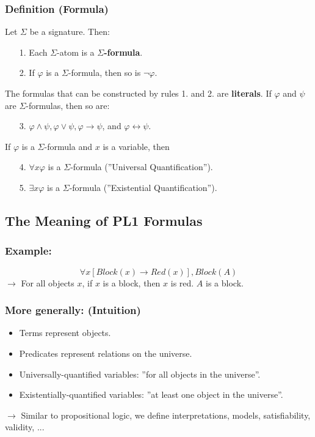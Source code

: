 \documentclass[conference]{styles/acmsiggraph}
\begin{document}
        \subsubsection{Definition (Formula)}
            Let $\Sigma$ be a signature. Then:
            \begin{enumerate}
                \item[1.] Each $\Sigma$-atom is a \textbf{$\Sigma$-formula}.
                \item[2.] If $\varphi$ is a $\Sigma$-formula, then so is $\lnot \varphi$.
            \end{enumerate}
            The formulas that can be constructed by rules 1. and 2. are \textbf{literals}.\newline
            If $\varphi$ and $\psi$ are $\Sigma$-formulas, then so are:
            \begin{enumerate}
                \item[3.] $\varphi \wedge \psi, \varphi \vee \psi, \varphi \rightarrow \psi$, and $\varphi \leftrightarrow \psi$.
            \end{enumerate}
            If $\varphi$ is a $\Sigma$-formula and $x$ is a variable, then
            \begin{enumerate}
                \item[4.] $\forall x \varphi$ is a $\Sigma$-formula (''Universal Quantification'').
                \item[5.] $\exists x \varphi$ is a $\Sigma$-formula (''Existential Quantification'').
            \end{enumerate}
        
    \subsection{The Meaning of PL1 Formulas}
        \subsubsection{Example:}
            $$\forall x [Block(x) \rightarrow Red(x)], Block(A)$$
            $\rightarrow$ For all objects $x$, if $x$ is a block, then $x$ is red. $A$ is a block.
        
        \subsubsection{More generally: (Intuition)}
            \begin{itemize}
                \item Terms represent objects.
                \item Predicates represent relations on the universe.
                \item Universally-quantified variables: ''for all objects in the universe''.
                \item Existentially-quantified variables: ''at least one object in the universe''.
            \end{itemize}
            $\rightarrow$ Similar to propositional logic, we define interpretations, models, satisfiability, validity, ...
    
\end{document}
